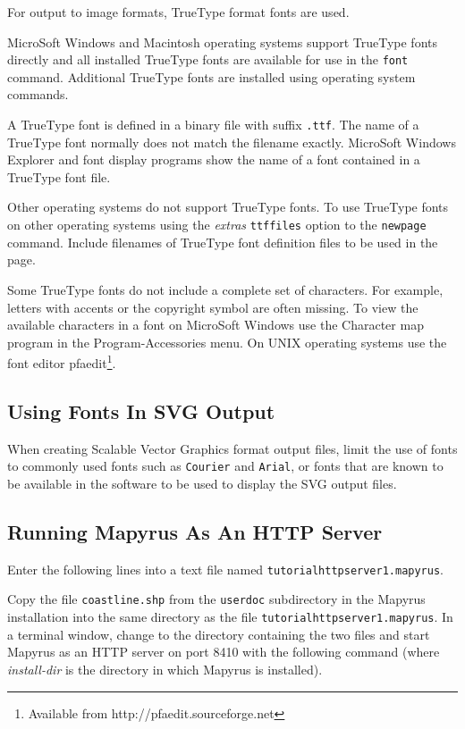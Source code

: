 For output to image formats, TrueType format fonts are used.

MicroSoft Windows and Macintosh operating systems support TrueType
fonts directly and all installed TrueType fonts are available
for use in the \texttt{font} command.
Additional TrueType fonts are installed using operating system commands.

A TrueType font is defined in a binary file with suffix
\texttt{.ttf}.
The name of a TrueType font normally does not match the filename exactly.
MicroSoft Windows Explorer and font display programs show the name of
a font contained in a TrueType font file.

Other operating systems do not support TrueType fonts.  To use TrueType fonts
on other operating systems using the \textit{extras} \texttt{ttffiles} option
to the \texttt{newpage} command.  Include filenames of TrueType font definition
files to be used in the page.

Some TrueType fonts do not include a complete set of characters.
For example, letters with accents or the copyright symbol are often
missing.  To view the available characters in a font on MicroSoft Windows
use the Character map program in the Program-Accessories
menu.  On UNIX operating systems use the font editor
pfaedit\footnote{Available from http://pfaedit.sourceforge.net}.

\subsection{Using Fonts In SVG Output}
\label{svgfonts}

When creating Scalable Vector Graphics format output files,
limit the use of fonts to commonly used fonts such as \texttt{Courier}
and \texttt{Arial}, or fonts that are known to be available in the
software to be used to display the SVG output files.

\subsection{Running Mapyrus As An HTTP Server}
\label{tutorialhttpserver}

Enter the following lines into a text file named
\texttt{tutorialhttpserver1.mapyrus}.



Copy the file \texttt{coastline.shp} from the \texttt{userdoc}
subdirectory in the
Mapyrus installation into the same directory as the file
\texttt{tutorialhttpserver1.mapyrus}.  In a terminal window, change to the
directory containing the two files and start Mapyrus as an HTTP server on port
8410 with the following command
(where \textit{install-dir} is the directory in which Mapyrus is installed).

